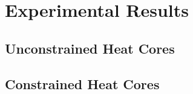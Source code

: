 \chapter{Experimental Results}
\label{ch:potential}

\section{Unconstrained Heat Cores}

\section{Constrained Heat Cores}